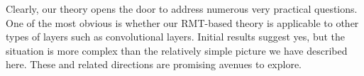 
Clearly, our theory opens the door to address numerous very practical questions.  %
One of the most obvious is whether our RMT-based theory is applicable to other types of layers such as convolutional layers.
Initial results suggest yes, but the situation is more complex than the relatively simple picture we have described here.
These and related directions are promising avenues to explore.


